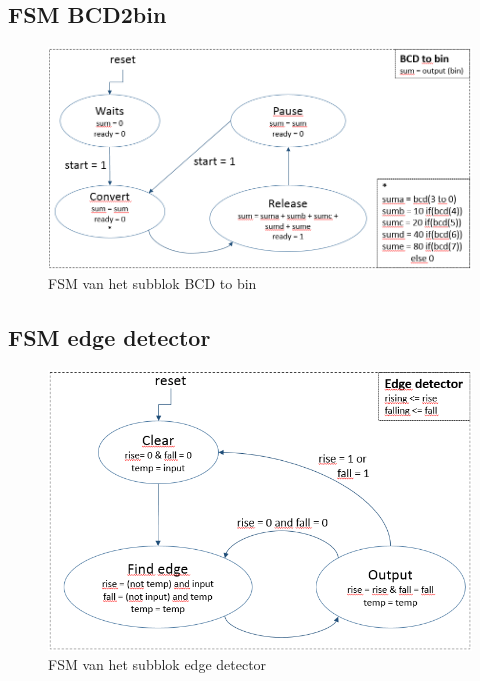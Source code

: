 \documentclass[a4paper, twoside, 10pt]{article}
\begin{document}
\subsection{FSM BCD2bin}
\begin{figure}[ht]
\begin{center}
\includegraphics[keepaspectratio=true,scale=0.75]{FSM_BCD_to_bin.png}
\caption{FSM van het subblok BCD to bin}
\label{fig: BCD2bin}
\end{center}
\end{figure}

\subsection{FSM edge detector}
\begin{figure}[ht]
\begin{center}
\includegraphics[keepaspectratio=true,scale=0.88]{FSM_Edge_detector.png}
\caption{FSM van het subblok edge detector}
\label{fig: edge_detector}
\end{center}
\end{figure}
\end{document}

